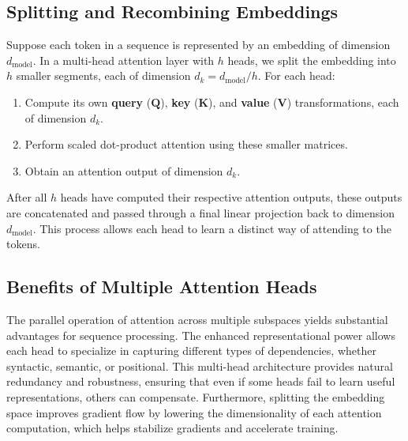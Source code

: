 \subsection{Splitting and Recombining Embeddings}
Suppose each token in a sequence is represented by an embedding of dimension $d_\text{model}$. In a multi-head attention layer with $h$ heads, we split the embedding into $h$ smaller segments, each of dimension $d_k = d_\text{model} / h$. For each head:
\begin{enumerate}
    \item Compute its own \textbf{query} ($\mathbf{Q}$), \textbf{key} ($\mathbf{K}$), and \textbf{value} ($\mathbf{V}$) transformations, each of dimension $d_k$.
    \item Perform scaled dot-product attention using these smaller matrices.
    \item Obtain an attention output of dimension $d_k$.
\end{enumerate}
After all $h$ heads have computed their respective attention outputs, these outputs are concatenated and passed through a final linear projection back to dimension $d_\text{model}$. This process allows each head to learn a distinct way of attending to the tokens.

\subsection{Benefits of Multiple Attention Heads}
\noindent
The parallel operation of attention across multiple subspaces yields substantial advantages for sequence processing. The enhanced representational power allows each head to specialize in capturing different types of dependencies, whether syntactic, semantic, or positional. This multi-head architecture provides natural redundancy and robustness, ensuring that even if some heads fail to learn useful representations, others can compensate. Furthermore, splitting the embedding space improves gradient flow by lowering the dimensionality of each attention computation, which helps stabilize gradients and accelerate training.

